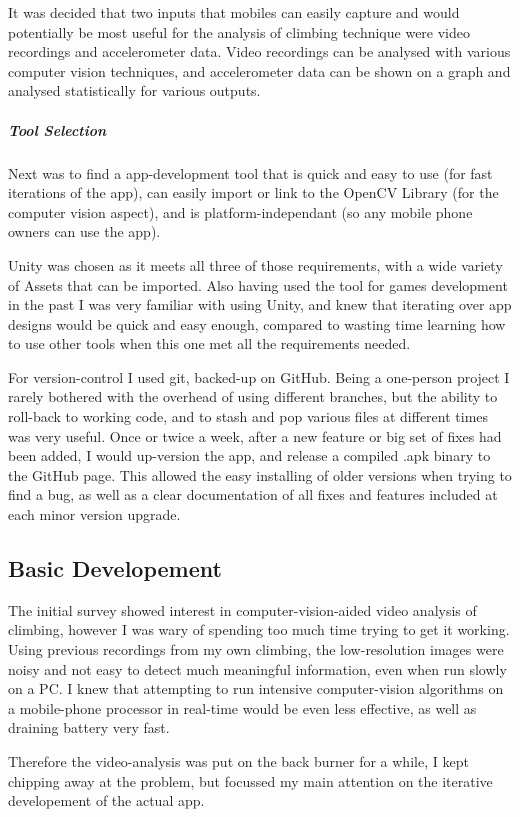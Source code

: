 It was decided that two inputs that mobiles can easily capture and would potentially be most useful for the analysis of climbing technique were video recordings and accelerometer data. Video recordings can be analysed with various computer vision techniques, and accelerometer data can be shown on a graph and analysed statistically for various outputs.

\subparagraph{Tool Selection}
Next was to find a app-development tool that is quick and easy to use (for fast iterations of the app), can easily import or link to the OpenCV Library (for the computer vision aspect), and is platform-independant (so any mobile phone owners can use the app).

Unity was chosen as it meets all three of those requirements, with a wide variety of Assets that can be imported.
Also having used the tool for games development in the past I was very familiar with using Unity, and knew that iterating over app designs would be quick and easy enough, compared to wasting time learning how to use other tools when this one met all the requirements needed.

For version-control I used git, backed-up on GitHub. Being a one-person project I rarely bothered with the overhead of using different branches, but the ability to roll-back to working code, and to stash and pop various files at different times was very useful.
Once or twice a week, after a new feature or big set of fixes had been added, I would up-version the app, and release a compiled .apk binary to the GitHub page.
This allowed the easy installing of older versions when trying to find a bug, as well as a clear documentation of all fixes and features included at each minor version upgrade.


\subsection{Basic Developement}
The initial survey showed interest in computer-vision-aided video analysis of climbing, however I was wary of spending too much time trying to get it working. Using previous recordings from my own climbing, the low-resolution images were noisy and not easy to detect much meaningful information, even when run slowly on a PC.
I knew that attempting to run intensive computer-vision algorithms on a mobile-phone processor in real-time would be even less effective, as well as draining battery very fast.


Therefore the video-analysis was put on the back burner for a while, I kept chipping away at the problem, but focussed my main attention on the iterative developement of the actual app.

